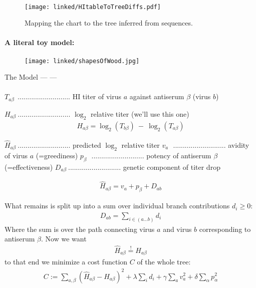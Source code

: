 \documentclass{beamer}
\begin{document}
\begin{darkframes}
\begin{frame}{\subsecname}
    \end{frame}

    \begin{frame}{\subsecname}
      \framesubtitle{}
      \begin{figure}
        \texttt{[image: linked/HItableToTreeDiffs.pdf]}
        \caption{\footnotesize Mapping the chart to the tree inferred from sequences. \cite{bedford15}}
      \end{figure}
    \end{frame}


    \begin{frame}{\subsecname}
      \framesubtitle{\small A literal toy model:}
      \begin{figure}
        \texttt{[image: linked/shapesOfWood.jpg]}
        \caption{\footnotesize \cite{rosipaw10}}
      \end{figure}
    \end{frame}

    \begin{frame}[allowframebreaks]{The Model --- \cite{neherBedford+16} ---}
      \framesubtitle{}
      $T_{a\beta}~\ $........................... HI titer of virus $a$ against antiserum $\beta$ (virus $b$)

      $H_{a\beta}~$........................... $\log_2$ relative titer (we'll use this one)
      \begin{align}
        H_{a\beta} = \log_2 (T_{b\beta}) ~ - ~\log_2 ( T_{a\beta})
      \end{align}

      $\hat{H}_{a\beta}~$........................... predicted $\log_2$ relative titer
      $v_{a}~~~$........................... avidity of virus $a$ (=greediness)
      $p_{\beta}~~~$........................... potency of antiserum $\beta$ (=effectiveness)
      $D_{a\beta}~$........................... genetic component of titer drop

      \begin{align}
        \hat{H}_{a\beta} = v_a + p_\beta + D_{ab}
      \end{align}


      What remains is split up into a sum over individual branch contributions $d_i \ge 0$:
      \begin{align}
        D_{ab} = \sum_{i \in (a ... b)} d_i
      \end{align}
      Where the sum is over the path connecting virus $a$ and virus $ b $ corresponding to antiserum $\beta$. Now we want
      \begin{align}
        \hat{H}_{a\beta} \stackrel{!}={} {H}_{a\beta}
      \end{align}
      to that end we minimize a cost function $C$ of the whole tree:
      \begin{align}
        C := \sum_{a,\beta}( \hat{H}_{a\beta} - {H}_{a\beta})^2 + \lambda \sum_i d_i + \gamma \sum_a v_a^2 + \delta \sum_\alpha p_\alpha^2
      \end{align}


\end{frame}
\end{darkframes}
\end{document}

